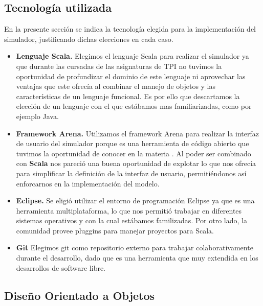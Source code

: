 \subsection{Tecnología utilizada}
En la presente sección se indica la tecnología elegida para la implementación del simulador, justificando dichas elecciones en cada caso.

\begin{itemize}


\item  \textbf{Lenguaje Scala.}
Elegimos el lenguaje Scala para realizar el simulador ya que durante las cursadas de las asignaturas de TPI no tuvimos la oportunidad de profundizar el dominio de este lenguaje ni aprovechar las ventajas que este ofrecía al combinar el manejo de objetos y las características de un lenguaje funcional. Es por ello que descartamos la elección de un lenguaje con el que estábamos mas familiarizadas, como por ejemplo Java.

\item  \textbf{Framework Arena.}
Utilizamos el framework Arena para realizar la interfaz de usuario del simulador porque es una herramienta de código abierto que tuvimos la oportunidad de conocer en la materia \ui. Al poder ser combinado con \textbf{Scala} nos pareció una buena oportunidad de explotar lo que nos ofrecía para simplificar la definición de la interfaz de usuario, permitiéndonos así enforcarnos en la implementación del modelo. 

\item  \textbf{Eclipse.}
Se eligió utilizar el entorno de programación Eclipse ya que es una herramienta multiplataforma, lo que nos permitió trabajar en diferentes sistemas operativos y con la cual estábamos familizadas.  Por otro lado, la comunidad provee pluggins para manejar proyectos para Scala.

\item  \textbf{Git}
Elegimos git como repositorio externo para trabajar colaborativamente durante el desarrollo, dado que es una herramienta que muy extendida en los desarrollos de software libre.

\end{itemize}

\subsection{Diseño Orientado a Objetos}

